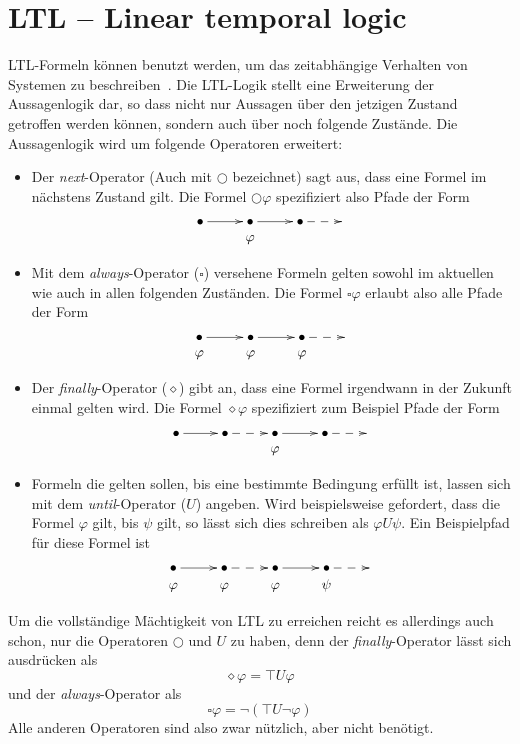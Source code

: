 \section{LTL -- Linear temporal logic}
LTL-Formeln können benutzt werden, um das zeitabhängige Verhalten von Systemen zu beschreiben~\cite{ltlbasics}.
Die LTL-Logik stellt eine Erweiterung der Aussagenlogik dar, so dass nicht nur Aussagen über den jetzigen Zustand getroffen werden können, sondern auch über noch folgende Zustände.
Die Aussagenlogik wird um folgende Operatoren erweitert:
\begin{itemize}
\item Der \emph{next}-Operator (Auch mit $\bigcirc$ bezeichnet) sagt aus, dass eine Formel im nächstens Zustand gilt.
  Die Formel $\bigcirc\varphi$ spezifiziert also Pfade der Form
  \[ \xymatrix @R=0em {
      \bullet \ar[r] & \bullet \ar[r] & \bullet \ar@{-->}[r] &\\
      & \varphi & &
  }
    \]
\item Mit dem \emph{always}-Operator ($\square$) versehene Formeln gelten sowohl im aktuellen wie auch in allen folgenden Zuständen.
  Die Formel $\square\varphi$ erlaubt also alle Pfade der Form
  \[ \xymatrix @R=0em {
      \bullet \ar[r] & \bullet \ar[r] & \bullet \ar@{-->}[r] &\\
      \varphi & \varphi & \varphi &
  }
    \]
\item Der \emph{finally}-Operator ($\diamond$) gibt an, dass eine Formel irgendwann in der Zukunft einmal gelten wird.
  Die Formel $\diamond\varphi$ spezifiziert zum Beispiel Pfade der Form
  \[ \xymatrix @R=0em {
    \bullet \ar[r] & \bullet \ar@{-->}[r] & \bullet \ar[r] & \bullet \ar@{-->}[r] & \\
    & & \varphi & &
  } \]
\item Formeln die gelten sollen, bis eine bestimmte Bedingung erfüllt ist, lassen sich mit dem \emph{until}-Operator ($U$) angeben.
  Wird beispielsweise gefordert, dass die Formel $\varphi$ gilt, bis $\psi$ gilt, so lässt sich dies schreiben als $\varphi U\psi$.
  Ein Beispielpfad für diese Formel ist
  \[ \xymatrix @R=0em {
    \bullet \ar[r] & \bullet \ar@{-->}[r] & \bullet \ar[r] & \bullet \ar@{-->}[r] & \\
    \varphi & \varphi & \varphi & \psi &
  } \]
\end{itemize}
Um die vollständige Mächtigkeit von LTL zu erreichen reicht es allerdings auch schon, nur die Operatoren $\bigcirc$ und $U$ zu haben, denn der \emph{finally}-Operator lässt sich ausdrücken als
\[ \diamond\varphi = \top U \varphi \]
und der \emph{always}-Operator als
\[ \square\varphi = \lnot (\top U \lnot\varphi) \]
Alle anderen Operatoren sind also zwar nützlich, aber nicht benötigt.